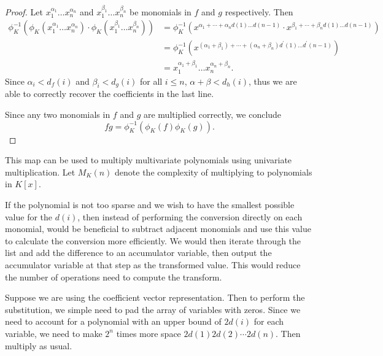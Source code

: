 \begin{proof}
    Let $x_1^{\alpha_1}\ldots x_n^{\alpha_n}$ and $x_1^{\beta_1}\ldots x_n^{\beta_n}$ be monomials in $f$ and $g$ respectively. Then
    \begin{align*}
        \phi_K^{-1}(\phi_K(x_1^{\alpha_1}\ldots x_n^{\alpha_n}) \cdot \phi_K(x_1^{\beta_1}\ldots x_n^{\beta_n})) 
        &= \phi_K^{-1}(x^{\alpha_1 + \cdots  + \alpha_n d(1) \ldots d(n-1)} \cdot x^{\beta_1 + \cdots + \beta_n d(1) \ldots d(n-1)})\\
        &= \phi_K^{-1}(x^{(\alpha_1 + \beta_1) + \cdots + (\alpha_n + \beta_n)d^\prime(1) \ldots d^\prime(n-1)})\\
        &= x_1^{\alpha_1 + \beta_1} \ldots x_n^{\alpha_n + \beta_n}.
    \end{align*}
    Since $\alpha_i < d_f(i)$ and $\beta_i < d_g(i)$ for all $i \le n$, $\alpha + \beta < d_h(i)$, thus we are able to correctly recover the coefficients in the last line.

    Since any two monomials in $f$ and $g$ are multiplied correctly, we conclude
    \[
        f g= \phi^{-1}_K(\phi_K(f) \phi_K(g)).
    \]
\end{proof}

This map can be used to multiply multivariate polynomials using univariate multiplication. Let $M_K(n)$ denote the complexity of multiplying to polynomials in $K[x]$. 

If the polynomial is not too sparse and we wish to have the smallest possible value for the $d(i)$, then instead of performing the conversion directly on each monomial, would be beneficial to subtract adjacent monomials and use this value to calculate the conversion more efficiently. We would then iterate through the list and add the difference to an accumulator variable, then output the accumulator variable at that step as the transformed value. This would reduce the number of operations need to compute the transform.

Suppose we are using the coefficient vector representation. Then to perform the substitution, we simple need to pad the array of variables with zeros. Since we need to account for a polynomial with an upper bound of $2d(i)$ for each variable, we need to make $2^n$ times more space $2d(1)2d(2)\cdots 2d(n)$. Then multiply as usual.

